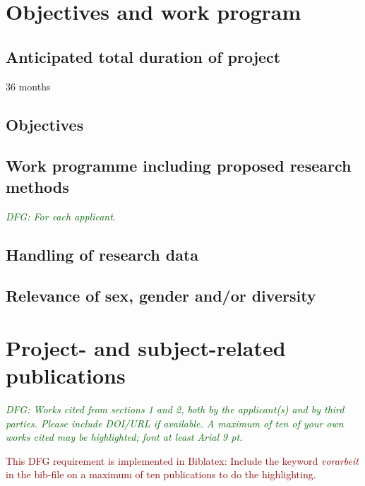 \documentclass[a4paper,11pt]{amsart}
\theoremstyle{definition}
\newcommand{\<}{\langle}
\renewcommand{\>}{\rangle}
\newcommand{\dfg}[1]{\emph{\textcolor{darkgreen}{DFG: #1}}}
\newcommand{\tk}[1]{\textcolor{darkred}{#1}}
\begin{document}
\lipsum[4]


\section{Objectives and work program}
\label{sec:objAndWork}

\subsection{Anticipated total duration of project}
36 months

\subsection{Objectives}
\label{sec:objectives}

\lipsum[5]

\subsection{Work programme including proposed research methods}
\dfg{For each applicant.}

\lipsum[6]

\subsection{Handling of research data}

\lipsum[7]

\subsection{Relevance of sex, gender and/or diversity}

\lipsum[8]


\section{Project- and subject-related publications}
\label{sec:bib}

\dfg{Works cited from sections 1 and 2, both by the applicant(s) and
  by third parties. Please include DOI/URL if available. A maximum of
  ten of your own works cited may be highlighted; font at least Arial
  9 pt.}

\tk{This DFG requirement is implemented in Biblatex: Include the
  keyword \emph{vorarbeit} in the bib-file on a maximum of ten
  publications to do the highlighting.}
\end{document}

